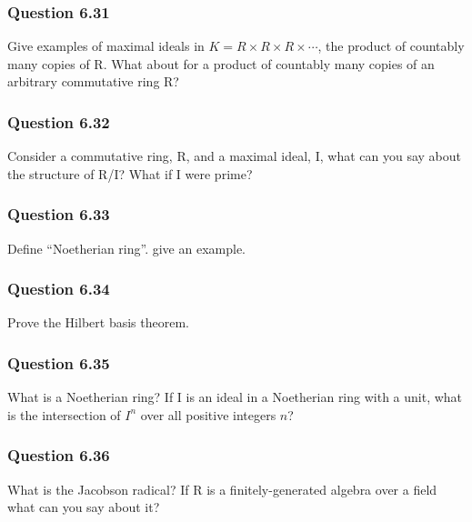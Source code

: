 \hypertarget{question-6.31}{%
\subsubsection{Question 6.31}\label{question-6.31}}

Give examples of maximal ideals in
\(K = R \times R \times R \times \cdots\), the product of countably many
copies of R. What about for a product of countably many copies of an
arbitrary commutative ring R?

\hypertarget{question-6.32}{%
\subsubsection{Question 6.32}\label{question-6.32}}

Consider a commutative ring, R, and a maximal ideal, I, what can you say
about the structure of R/I? What if I were prime?

\hypertarget{question-6.33}{%
\subsubsection{Question 6.33}\label{question-6.33}}

Define ``Noetherian ring''. give an example.

\hypertarget{question-6.34}{%
\subsubsection{Question 6.34}\label{question-6.34}}

Prove the Hilbert basis theorem.

\hypertarget{question-6.35}{%
\subsubsection{Question 6.35}\label{question-6.35}}

What is a Noetherian ring? If I is an ideal in a Noetherian ring with a
unit, what is the intersection of \(I^n\) over all positive integers
\(n\)?

\hypertarget{question-6.36}{%
\subsubsection{Question 6.36}\label{question-6.36}}

What is the Jacobson radical? If R is a finitely-generated algebra over
a field what can you say about it?

